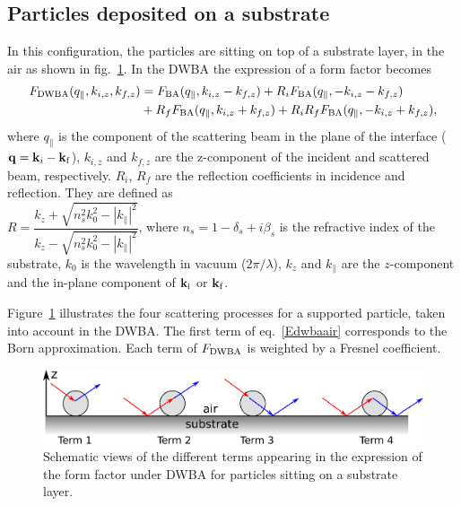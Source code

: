 \subsection{Particles deposited on a substrate}
In this configuration, the particles are sitting on top of a substrate layer, in the air as shown in fig.~\ref{fig:SchemDWBA}. In the DWBA the expression of a form factor becomes 
\begin{align}
F_{\rm{DWBA}}(q_{\parallel}, k_{i,z}, k_{f,z}) &= F_{\rm{BA}}(q_{\parallel}, k_{i,z}-k_{f,z})+ R_i F_{\rm{BA}}(q_{\parallel}, -k_{i,z}-k_{f,z}) \nonumber \\
&+ R_f F_{\rm{BA}}(q_{\parallel}, k_{i,z}+k_{f,z}) + R_i R_f F_{\rm{BA}}(q_{\parallel},-k_{i,z}+k_{f,z}), \label{Edwbaair}
\end{align}
where $q_{\parallel}$ is the component of the scattering beam in the plane of the interface ($\mathbf{q}=\mathbf{k}_i-\mathbf{k}_\text{f}$), $k_{i,z}$ and $k_{f,z}$ are the z-component of the incident and scattered beam, respectively. $R_i$, $R_f$ are the reflection coefficients in incidence and reflection. They are defined as\\ $R=\dfrac{k_z+\sqrt{n_s^2k_0^2-|k_{\parallel}|^2}}{k_z-\sqrt{n_s^2 k_0^2-|k_{\parallel}|^2}}$, where $n_s=1-\delta_s +i \beta_s$ is the refractive index of the substrate, $k_0$ is the wavelength in vacuum ($2\pi /\lambda$), $k_z$ and $k_{\parallel}$ are the $z$-component and the in-plane component of $\mathbf{k}_\text{i}$ or $\mathbf{k}_\text{f}$. \\


\vspace{18pt}

Figure~\ref{fig:SchemDWBA} illustrates the four scattering processes for a supported particle, taken into account in the DWBA. The first term of eq.~\ref{Edwbaair}  corresponds to the Born approximation. Each term of $F_{\rm{DWBA}}$ is weighted by a Fresnel coefficient. 

\begin{figure}[ht]
\begin{center}
\includegraphics[width=\textwidth]{fig/drawing/drawingDWBA.pdf}
\end{center}
\caption{Schematic views of the different terms appearing in the expression of the form factor under DWBA for particles sitting on a substrate layer.}
\label{fig:SchemDWBA}
\end{figure}



